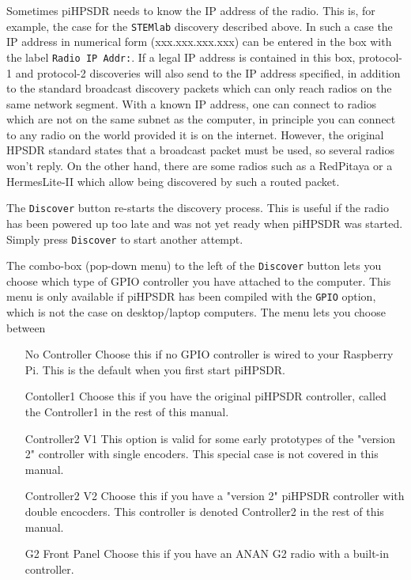 \documentclass[12pt]{book}
\def\rett#1{\texttt{\color{red}#1}}
\begin{document}
Sometimes piHPSDR needs to know the IP address of the radio. This is, for example, the case for the 
\texttt{STEMlab} discovery
described above. In such a case the IP address in numerical form (xxx.xxx.xxx.xxx) can be entered in the box
with the label \rett{Radio IP Addr:}. If a legal IP address is contained in this box, protocol-1 and 
protocol-2 discoveries
will also send to the IP address specified, in addition to the standard broadcast discovery packets which 
can only reach
radios on the same network segment. With a known IP address,  one can
connect to radios which are not on the same subnet as the computer, in principle you can connect to any 
radio on the world
provided it is on the internet. However, the original HPSDR standard states that a broadcast packet must be 
used, so several
radios won't reply. On the other hand, there are some radios such as a RedPitaya or a HermesLite-II which 
allow being discovered by such a routed packet. 

The \rett{Discover} button re-starts the discovery process. This is useful if the radio has been powered up 
too late and
was not yet ready when piHPSDR was started. Simply press \rett{Discover} to start another attempt.

The combo-box (pop-down menu) to the left of the \rett{Discover} button lets you choose which type of GPIO 
controller you
have attached to the computer. This menu is only available if piHPSDR has been compiled with the 
\texttt{GPIO} option, which
is not the case on desktop/laptop computers. The menu lets you choose between

\begin{itemize}[font=\texttt, left=80pt]
\item[No Controller]{Choose this if no GPIO controller is wired to your Raspberry Pi. This is the default 
when you first start piHPSDR.}
\item[Contoller1]{Choose this if you have the original piHPSDR controller, called the Controller1 in the rest
of this manual.}
\item[Controller2 V1]{This option is valid for some early prototypes of the "version 2" controller with 
single encoders. This special case is not covered in this manual.}
\item[Controller2 V2]{Choose this if you have a "version 2" piHPSDR controller with double encocders.
This controller is denoted Controller2 in the rest of this manual.}
\item[G2 Front Panel]{Choose this if you have an ANAN G2 radio with a built-in controller.}
\end{itemize}
\end{document}
